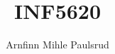 \documentclass[a4paper, english,10pt]{article}
\begin{document}
\title{INF5620}
\author{Arnfinn Mihle Paulsrud}
\maketitle






%



%
%
\end{document}
